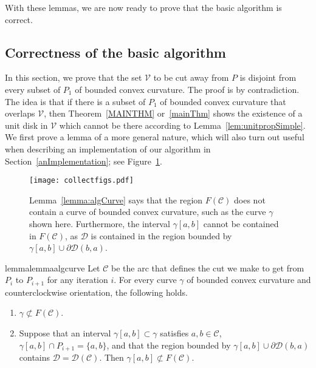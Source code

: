 \documentclass{article}
\newcommand{\PP}{P}
\newcommand{\VV}{\mathcal V}
\newcommand{\cutreg}{F}
\newcommand{\cut}{\mathcal C}
\newcommand{\cutdisk}{\mathcal D}
\begin{document}
With these lemmas, we are now ready to prove that the basic algorithm is correct.

\subsection{Correctness of the basic algorithm}\label{correctness}

In this section, we prove that the set $\VV$ to be cut away from $\PP$
is disjoint from every subset of $\PP_1$ of bounded convex curvature.
The proof is by contradiction. The idea is that if there is a subset of
$\PP_1$ of bounded convex curvature
that overlaps $\VV$, then Theorem~\ref{MAINTHM} or~\ref{mainThm} shows the existence of a unit disk in $\VV$ which cannot be there according to Lemma~\ref{lem:unitpropSimple}.
We first prove a lemma of a more general nature, which will also turn out useful when describing an implementation of our algorithm in Section~\ref{anImplementation}; see Figure~\ref{fig:lemma:algCurve}.

\begin{figure}
\centering
\texttt{[image: collectfigs.pdf]}
\caption{Lemma~\ref{lemma:algCurve} says that the region $\cutreg(\cut)$ does not contain a curve of bounded convex curvature, such as the curve $\gamma$ shown here.
Furthermore, the interval $\gamma[a,b]$ cannot be contained in $\cutreg(\cut)$, as $\cutdisk$ is contained in the region bounded by $\gamma[a,b]\cup\partial\cutdisk(b,a)$.}
\label{fig:lemma:algCurve}
\end{figure}

\begin{restatable}{lemma}{lemmaalgcurve}
\label{lemma:algCurve}
Let $\cut$ be the arc that defines the cut we make to get from $\PP_i$ to $\PP_{i+1}$ for any iteration $i$.
For every curve $\gamma$ of bounded convex curvature and counterclockwise orientation, the following holds.
\begin{enumerate}
\item
$\gamma\not\subset \cutreg(\cut)$.

\item\label{lemma:algCurve:it2}
Suppose that an interval $\gamma[a,b]\subset\gamma$ satisfies $a,b\in\cut$, $\gamma[a,b]\cap \PP_{i+1}=\{a,b\}$, and that the region bounded by $\gamma[a,b]\cup\partial\cutdisk(b,a)$ contains $\cutdisk=\cutdisk(\cut)$.
Then $\gamma[a,b]\not\subset \cutreg(\cut)$.
\end{enumerate}
\end{restatable}
\end{document}
